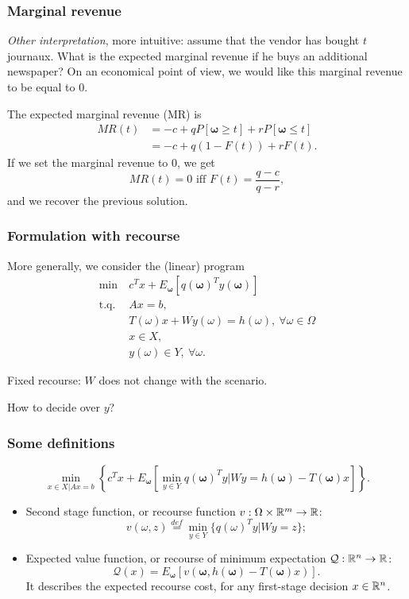 \documentclass{beamer}
\def\bomega{\boldsymbol\omega}
\def\cQ {{\mathcal{Q}}}
\def\red{\color{red}}
\begin{document}
\begin{frame}
\frametitle{Marginal revenue}

{\sl Other interpretation}, more intuitive: assume that the vendor has bought $t$ journaux.
What is the expected marginal revenue if he buys an additional newspaper?
On an economical point of view, we would like this marginal revenue to be equal to 0.

\mbox{}

The expected marginal revenue (MR) is
\begin{align*}
MR(t) &= -c + qP[\bomega \geq t] + rP[\bomega \leq t]\\
&= -c + q(1-F(t)) + rF(t).
\end{align*}
If we set the marginal revenue to 0, we get
\[
MR(t) = 0 \mbox{ iff } F(t) = \frac{q-c}{q-r},
\]
and we recover the previous solution.


\end{frame}

\begin{frame}
\frametitle{Formulation with recourse}

More generally, we consider the (linear) program
\begin{align*}
\min\ & c^Tx+E_{\bomega}[q(\bomega)^Ty(\bomega)] \\
\mbox{t.q. } & Ax = b, \\
& T(\omega)x + Wy(\omega) = h(\omega),\ \forall \omega
\in \Omega \\
& x \in X, \\
& y(\omega) \in Y,\ \forall \omega.
\end{align*}

\mbox{}

Fixed recourse: $W$ does not change with the scenario.

\mbox{}

How to decide over $y$?

\end{frame}

\begin{frame}
\frametitle{Some definitions}

\[
\min_{x \in X | Ax = b} \left\lbrace c^Tx + E_{\bomega} \left[ \min_{y
      \in Y} q(\bomega)^T y | W y = h(\bomega) - T(\bomega)x \right] \right\rbrace.
\]
\begin{itemize}
\item
{\red Second stage function}, or {\red recourse function} $v :
\Omega \times \mathbb{R}^m \rightarrow \mathbb{R}$:
\[
v(\omega, z) \overset{def}{=} \min_{y \in Y} \lbrace q(\omega)^Ty | W y = z \rbrace;
\]
\item
{\red Expected value function}, or recourse of minimum expectation
$\mathcal{Q} : \mathbb{R}^n \rightarrow \mathbb{R}$:
\[
\cQ(x) = E_{\bomega} [ v (\bomega, h(\bomega) - T(\bomega) x)].
\]
It describes the expected recourse cost, for any first-stage decision $x \in \mathbb{R}^n$.
\end{itemize}

\end{frame}
\end{document}
